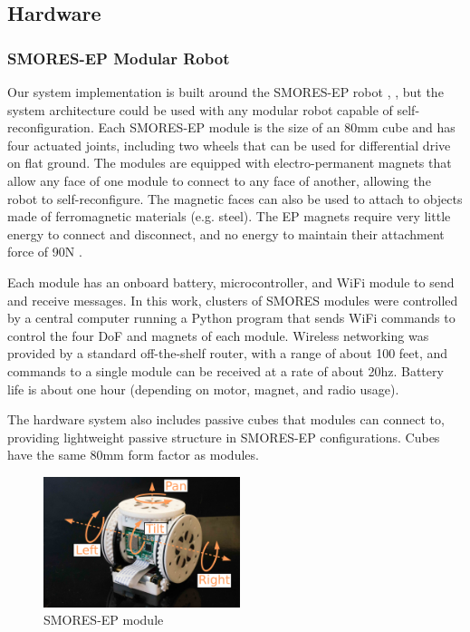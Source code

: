 \documentclass[journal]{IEEEtran}
\begin{document}
%


\subsection{Hardware} %
\label{sec:hardware}
%
\subsubsection{SMORES-EP Modular Robot} \label{sec:smores}
%
Our system implementation is built around the SMORES-EP robot \cite{tosun2016design},
\cite{tosun2017paintpots}, but the system architecture could
be used with any modular robot capable of self-reconfiguration. Each SMORES-EP module is the size of an 80mm cube
and has four actuated joints, including two wheels that can be
used for differential drive on flat ground.  The modules are equipped
with electro-permanent magnets that allow any face of one module to connect to
any face of another, allowing the robot to self-reconfigure. The magnetic faces
can also be used to attach to objects made of ferromagnetic materials (e.g. steel). 
The EP magnets require very little energy to connect and disconnect, and no energy to maintain their attachment force of 90N \cite{tosun2016design}.

Each module has an onboard battery, microcontroller, and WiFi
module to send and receive messages.  In this work, clusters of SMORES
modules were controlled by a central computer running a Python program that
sends WiFi commands to control the four DoF and magnets of each module.
Wireless networking was provided by a standard off-the-shelf  router, with a range of about 100 feet, and commands to a single module can be received at a rate of about 20hz.
Battery life is about one hour (depending on motor, magnet, and radio usage).

The hardware system also includes passive cubes that modules can connect to, providing lightweight passive structure in SMORES-EP configurations.  Cubes have the same 80mm form factor as modules.
%
\begin{figure}   
\begin{center}
\includegraphics[height=1.5in]{images/smores_dof.pdf}
\end{center}
\caption{SMORES-EP module}
\label{fig:smores-module}
\end{figure}
%
\end{document}
